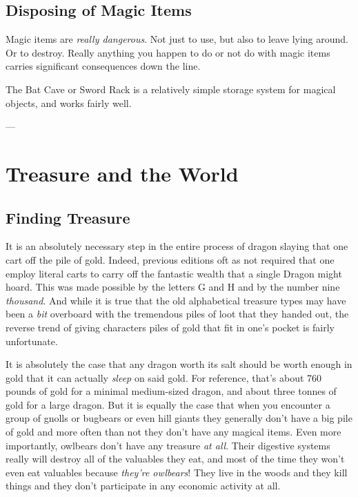 \subsection{Disposing of Magic Items}
\vspace*{-8pt}

Magic items are \textit{really dangerous}. Not just to use, but also to leave lying around. Or to destroy. Really anything you happen to do or not do with magic items carries significant consequences down the line.

The Bat Cave or Sword Rack is a relatively simple storage system for magical objects, and works fairly well.

---


\section{Treasure and the World}

\subsection{Finding Treasure}
\vspace*{-8pt}

It is an absolutely necessary step in the entire process of dragon slaying that one cart off the pile of gold. Indeed, previous editions oft as not required that one employ literal carts to carry off the fantastic wealth that a single Dragon might hoard. This was made possible by the letters G and H and by the number nine \textit{thousand}. And while it is true that the old alphabetical treasure types may have been a \textit{bit} overboard with the tremendous piles of loot that they handed out, the reverse trend of giving characters piles of gold that fit in one's pocket is fairly unfortunate.

It is absolutely the case that any dragon worth its salt should be worth enough in gold that it can actually \textit{sleep} on said gold. For reference, that's about 760 pounds of gold for a minimal medium-sized dragon, and about three tonnes of gold for a large dragon. But it is equally the case that when you encounter a group of gnolls or bugbears or even hill giants they generally don't have a big pile of gold and more often than not they don't have any magical items. Even more importantly, owlbears don't have any treasure \textit{at all}. Their digestive systems really will destroy all of the valuables they eat, and most of the time they won't even eat valuables because \textit{they're owlbears}! They live in the woods and they kill things and they don't participate in any economic activity at all.

